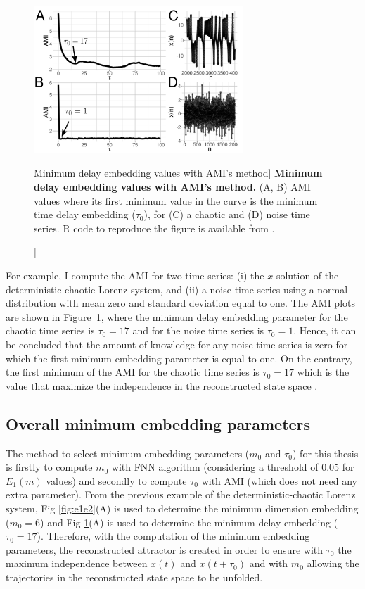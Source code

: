 \begin{figure}[!h]
  \centering
  \includegraphics[width=0.7\textwidth]{fig_3_04}
    \caption
	[Minimum delay embedding values with AMI's method]{
	{\bf Minimum delay embedding values with AMI's method.} 
    	(A, B) AMI values where its first minimum value in the curve
	is the minimum time delay embedding ($\tau_0$), 
	for (C) a chaotic and (D) noise time series.
	R code to reproduce the figure is available from \cite{xochicale2018}.
        }
    \label{fig:amis}
\end{figure}
For example, I compute the AMI for two time series:
(i) the $x$ solution of the deterministic chaotic Lorenz system, and 
(ii) a noise time series using a normal distribution with mean zero and 
standard deviation equal to one. The AMI plots are shown in 
Figure~\ref{fig:amis}, where the minimum delay embedding parameter for 
the chaotic time series is $\tau_0=17$ and for the noise time series is  
$\tau_0=1$. Hence, it can be concluded that the amount of knowledge for 
any noise time series is zero for which the first minimum embedding 
parameter is equal to one. On the contrary, the first minimum of the AMI 
for the chaotic time series is $\tau_0=17$ which is the value that maximize 
the independence in the reconstructed state space \citep{bradley2015}.

\subsection{Overall minimum embedding parameters} \label{sec:overall_minMT}
The method to select minimum embedding parameters ($m_0$ and $\tau_0$) 
for this thesis is firstly to compute $m_0$ with FNN algorithm 
(considering a threshold of 0.05 for $E_1(m)$ values) and secondly
to compute $\tau_0$ with AMI (which does not need any extra parameter).
From the previous example of the deterministic-chaotic 
Lorenz system, Fig \ref{fig:e1e2}(A) is used to determine 
the minimum dimension embedding ($m_0 =6$) and 
Fig \ref{fig:amis}(A) is used to determine the minimum delay embedding 
($\tau_0 =17$).
Therefore, with the computation of the minimum embedding parameters, the 
reconstructed attractor is created in order to ensure with $\tau_0$ the 
maximum independence between $x(t)$ and $x(t+\tau_0)$ and with $m_0$ 
allowing the trajectories in the reconstructed state space to be unfolded.

